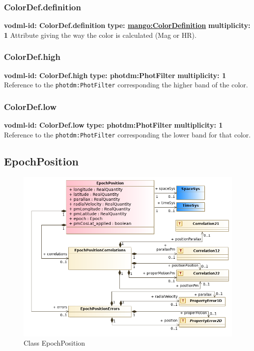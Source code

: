     \subsubsection{ColorDef.definition}
      \textbf{vodml-id: ColorDef.definition} \newline
      \textbf{type: \hyperref[sect:ColorDefinition]{mango:ColorDefinition}} \newline
      \textbf{multiplicity: 1} \newline 
      Attribute giving the way the color is calculated (Mag or HR).

    \subsubsection{ColorDef.high}
      \textbf{vodml-id: ColorDef.high} \newline
      \textbf{type: photdm:PhotFilter} \newline
      \textbf{multiplicity: 1} \newline 
      Reference to the \texttt{photdm:PhotFilter} corresponding the higher band of the color.

    \subsubsection{ColorDef.low}
      \textbf{vodml-id: ColorDef.low} \newline
      \textbf{type: photdm:PhotFilter} \newline
      \textbf{multiplicity: 1} \newline 
      Reference to the \texttt{photdm:PhotFilter} corresponding the lower band for that color.

  \subsection{EpochPosition}

      \begin{figure}[h]
        \includegraphics[width=1.0\textwidth]{../model/EpochPosition.png}
        \caption{Class EpochPosition}
        \label{fig:EpochPosition}
      \end{figure}

